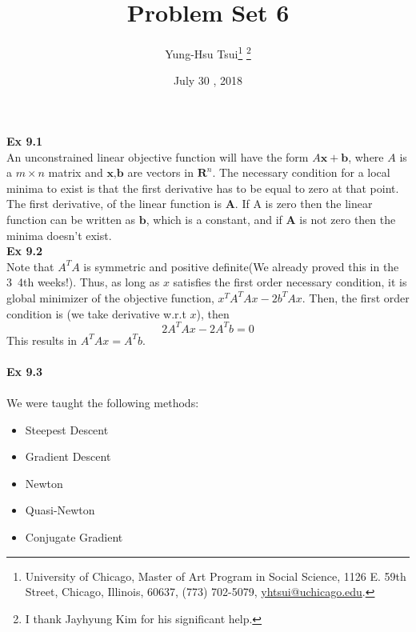 \documentclass[letterpaper,12pt]{article}
\theoremstyle{definition}
\begin{document}
	\title{Problem Set 6\\
	}
	\author{
		Yung-Hsu Tsui\footnote{University of Chicago, Master of Art Program in Social Science, 1126 E. 59th Street, Chicago, Illinois, 60637, (773) 702-5079, \href{mailto:}{yhtsui@uchicago.edu}.} \footnote{I thank Jayhyung Kim for his significant help.}\\[-2pt]
	}
	\date{July 30 ,  2018 }
	\vspace{-9mm}
	\maketitle
	\thispagestyle{empty}
	
	\pagestyle{fancy}
	\fancyhf{}
	\cfoot{\thepage}
	

\textbf{Ex 9.1} \\

An unconstrained linear objective function will have the form $A\textbf{x} + \textbf{b}$,  where $A$ is a $m \times n$ matrix and $\textbf{x,b}$ are vectors in $\textbf{R}^n$. The necessary condition for a local minima to exist is that the first derivative has to be equal to zero at that point.\\

The first derivative, of the linear function is $\textbf{A}$. If A is zero then the linear function can be written as $\textbf{b}$, which is a constant, and if $\textbf{A}$ is not zero then the minima doesn't exist. \\


\textbf{Ex 9.2} \\

Note that $A^T A$ is symmetric and positive definite(We already proved this in the 3~4th weeks!). Thus, as long as $x$ satisfies the first order necessary condition, it is global minimizer of the objective function, $x^T A^T A x -2b^T Ax$. Then, the first order condition is (we take derivative w.r.t $x$), then
\[ 2 A^T A x - 2A^T b = 0\]
This results in $A^T A x = A^T b$.  \\\\


\textbf{Ex 9.3} \\\\
We were taught the following methods:
\begin{itemize}
	\item Steepest Descent
	\item Gradient Descent
	\item Newton
	\item Quasi-Newton
	\item Conjugate Gradient
\end{itemize}
\end{document}
